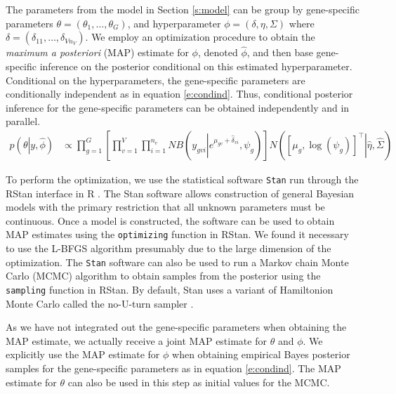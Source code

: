 \documentclass[useAMS,usenatbib,referee]{biom}
\begin{document}
The parameters from the model in Section \ref{s:model} can be group by gene-specific parameters $\theta = (\theta_1,\ldots,\theta_G)$, and hyperparameter $\phi = (\delta,\eta, \Sigma)$ where $\delta = (\delta_{11},\ldots,\delta_{Vn_V})$. We employ an optimization procedure to obtain the \emph{maximum a posteriori} (MAP) estimate for $\phi$, denoted $\hat{\phi}$, and then base gene-specific inference on the posterior conditional on this estimated hyperparameter. Conditional on the hyperparameters, the gene-specific parameters are conditionally independent as in equation \eqref{e:condind}. Thus, conditional posterior inference for the gene-specific parameters can be obtained independently and in parallel.
\begin{align}
p\left(\theta\left|y,\hat{\phi}\right.\right) 
&\propto \prod_{g=1}^G \left[ \prod_{v=1}^V \prod_{i=1}^{n_v} NB\left(y_{gvi}\left|e^{\mu_{gv}+\hat{\delta}_{vi}},\psi_g\right.\right) \right] N\left(\left.\left[\mu_g, \log(\psi_g) \right]^\top\right|\hat{\eta}, \hat{\Sigma} \right) 
\label{e:condind}
\end{align}


To perform the optimization, we use the statistical software {\tt Stan} \citep{stan-software:2014} run through the RStan interface \citep{rstan-software:2014} in R \citep{R2014}. The Stan software allows construction of general Bayesian models with the primary restriction that all unknown parameters must be continuous. Once a model is constructed, the software can be used to obtain MAP estimates \cite[Section 50.3,][]{stan-manual:2014} using the {\tt optimizing} function in RStan. We found it necessary to use the L-BFGS algorithm \cite[Section 55,][]{stan-manual:2014} presumably due to the large dimension of the optimization. The {\tt Stan} software can also be used to run a Markov chain Monte Carlo (MCMC) algorithm to obtain samples from the posterior using the {\tt sampling} function in RStan. By default, Stan uses a variant of Hamiltonion Monte Carlo \citep{neal2011mcmc} called the no-U-turn sampler \citep{hoffman2013no}. 

As we have not integrated out the gene-specific parameters when obtaining the MAP estimate, we actually receive a joint MAP estimate for $\theta$ and $\phi$. We explicitly use the MAP estimate for $\phi$ when obtaining empirical Bayes posterior samples for the gene-specific parameters as in equation \eqref{e:condind}. The MAP estimate for $\theta$ can also be used in this step as initial values for the MCMC. 
\end{document}
